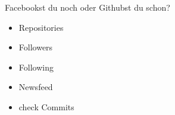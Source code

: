 \begin{frame}
\begin{columns}
\begin{column}{5cm}
\begin{block}{Facebookst du noch oder Githubst du schon?}
\begin{itemize}
                    \item Repositories
                    \item Followers
                    \item Following
                    \item Newsfeed
                    \item check Commits
                \end{itemize}
            \end{block}
        \end{column}
    \end{columns}
\end{frame}


